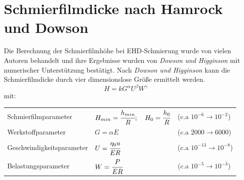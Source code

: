 \section{Schmierfilmdicke nach Hamrock und Dowson}
\label{sec:schmierfilmdicke_nach_hamrock_und_dowson}

Die Berechnung der Schmierfilmhöhe bei EHD-Schmierung wurde von vielen Autoren behandelt und ihre Ergebnisse wurden von \textit{Dowson und Higginson} mit numerischer Unterstützung bestätigt.
Nach \textit{Dowson und Higginson} kann die Schmierfilmdicke durch vier dimensionslose Größe ermittelt werden.
\begin{equation}
    \label{eq:allgemein_schmierfilmdicke}
    H = k G^{\alpha} U^{\beta} W^{\gamma}
\end{equation}
%
mit:

\begin{tabular}{lll}
    Schmierfilmparameter      & $H_{min} = \cfrac{h_{min}}{R} ;\quad H_0 = \cfrac{h_0}{R}$ & (c.a $10^{-6} \rightarrow 10^{-2}$)   \\
    Werkstoffparameter        & $G = \alpha E$                                             & (c.a $2000 \rightarrow 6000$)         \\
    Geschwindigkeitsparameter & $U = \cfrac{\eta_0 u}{E R}$                                & (c.a $10^{-13} \rightarrow 10 ^{-8}$) \\
    Belastungsparameter       & $W = \cfrac{P}{E R}$                                       & (c.a $10^{-5} \rightarrow 10^{-3}$)
\end{tabular}
%

